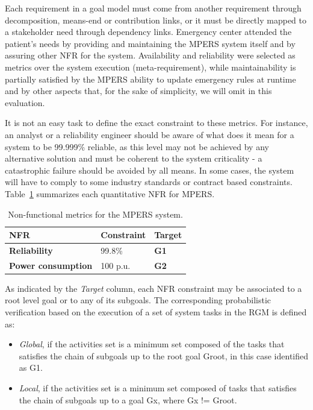 Each requirement in a goal model must come from another requirement through decomposition, means-end or contribution links, or it must be directly mapped to a stakeholder need through dependency links. Emergency center attended the patient's needs by providing and maintaining the MPERS system itself and by assuring other NFR for the system. Availability and reliability were selected as metrics over the system execution (meta-requirement), while maintainability is partially satisfied by the MPERS ability to update emergency rules at runtime and by other aspects that, for the sake of simplicity, we will omit in this evaluation.

It is not an easy task to define the exact constraint to these metrics. For instance, an analyst or a reliability engineer should be aware of what does it mean for a system to be 99.999\% reliable, as this level may not be achieved by any alternative solution and must be coherent to the system criticality - a catastrophic failure should be avoided by all means. In some cases, the system will have to comply to some industry standards or contract based constraints. Table~\ref{tab:MPERS_NFR_C} summarizes each quantitative NFR for MPERS.
\medskip

\begin{table}[h]\label{tab:MPERS_NFR_C}
{\renewcommand{\arraystretch}{1.5}
\begin{tabularx}{\textwidth}{@{}XXX@{}}
\toprule
\textbf{NFR}               & \textbf{Constraint} & \textbf{Target}        \\ \midrule
\textbf{Reliability}       & 99.8\%            & \textbf{G1} \\
\textbf{Power consumption} & 100 p.u.            & \textbf{G2}          \\ \bottomrule
\end{tabularx}
}
\caption{Non-functional metrics for the MPERS system.}
\end{table}


As indicated by the \textit{Target} column, each NFR constraint may be associated to a root level goal or to any of its subgoals. The corresponding probabilistic verification based on the execution of a set of system tasks in the RGM is defined as:

\begin{itemize}

\item \textit{Global}, if the activities set is a minimum set composed of the tasks that satisfies the chain of subgoals up to the root goal Groot, in this case identified as G1.
\medskip

\item \textit{Local}, if the activities set is a minimum set composed of tasks that satisfies the chain of subgoals up to a goal Gx, where Gx != Groot.
\medskip

\end{itemize}

